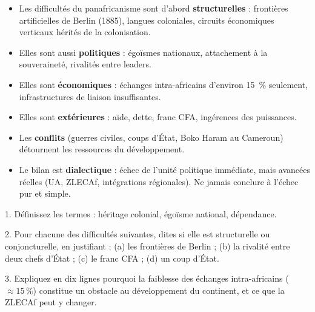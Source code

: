 \documentclass[11pt]{article}
\begin{document}
\begin{aretenir}
\begin{itemize}
\item Les difficultés du panafricanisme sont d'abord \textbf{structurelles} : frontières artificielles de Berlin (1885), langues coloniales, circuits économiques verticaux hérités de la colonisation.
\item Elles sont aussi \textbf{politiques} : égoïsmes nationaux, attachement à la souveraineté, rivalités entre leaders.
\item Elles sont \textbf{économiques} : échanges intra-africains d'environ \num{15}~\% seulement, infrastructures de liaison insuffisantes.
\item Elles sont \textbf{extérieures} : aide, dette, franc CFA, ingérences des puissances.
\item Les \textbf{conflits} (guerres civiles, coups d'État, Boko Haram au Cameroun) détournent les ressources du développement.
\item Le bilan est \textbf{dialectique} : échec de l'unité politique immédiate, mais avancées réelles (UA, ZLECAf, intégrations régionales). Ne jamais conclure à l'échec pur et simple.
\end{itemize}
\end{aretenir}

\begin{exercice}
1. Définissez les termes : héritage colonial, égoïsme national, dépendance.\par
2. Pour chacune des difficultés suivantes, dites si elle est structurelle ou conjoncturelle, en justifiant : (a) les frontières de Berlin ; (b) la rivalité entre deux chefs d'État ; (c) le franc CFA ; (d) un coup d'État.\par
3. Expliquez en dix lignes pourquoi la faiblesse des échanges intra-africains (\(\approx 15\,\%\)) constitue un obstacle au développement du continent, et ce que la ZLECAf peut y changer.
\end{exercice}
\end{document}
